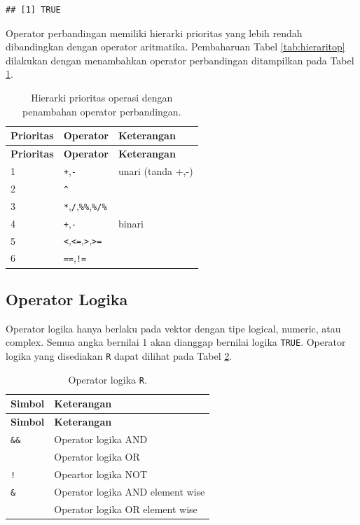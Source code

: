 \documentclass[12pt,]{krantz}
\begin{document}
\begin{verbatim}
## [1] TRUE
\end{verbatim}

Operator perbandingan memiliki hierarki prioritas yang lebih rendah dibandingkan dengan operator aritmatika. Pembaharuan Tabel \ref{tab:hieraritop} dilakukan dengan menambahkan operator perbandingan ditampilkan pada Tabel \ref{tab:hierperbandtop}.

\begin{longtable}[]{@{}lll@{}}
\caption{\label{tab:hierperbandtop} Hierarki prioritas operasi dengan penambahan operator perbandingan.}\tabularnewline
\toprule
\textbf{Prioritas} & \textbf{Operator} & \textbf{Keterangan}\tabularnewline
\midrule
\endfirsthead
\toprule
\textbf{Prioritas} & \textbf{Operator} & \textbf{Keterangan}\tabularnewline
\midrule
\endhead
1 & \texttt{+},\texttt{-} & unari (tanda +,-)\tabularnewline
2 & \texttt{\^{}} &\tabularnewline
3 & \texttt{*},\texttt{/},\texttt{\%\%},\texttt{\%/\%} &\tabularnewline
4 & \texttt{+},\texttt{-} & binari\tabularnewline
5 & \texttt{\textless{}},\texttt{\textless{}=},\texttt{\textgreater{}},\texttt{\textgreater{}=} &\tabularnewline
6 & \texttt{==},\texttt{!=} &\tabularnewline
\bottomrule
\end{longtable}

\hypertarget{operator-logika}{%
\subsection{Operator Logika}\label{operator-logika}}

Operator logika hanya berlaku pada vektor dengan tipe logical, numeric, atau complex. Semua angka bernilai 1 akan dianggap bernilai logika \texttt{TRUE}. Operator logika yang disediakan \texttt{R} dapat dilihat pada Tabel \ref{tab:oplogika}.

\begin{longtable}[]{@{}ll@{}}
\caption{\label{tab:oplogika} Operator logika \texttt{R}.}\tabularnewline
\toprule
\textbf{Simbol} & \textbf{Keterangan}\tabularnewline
\midrule
\endfirsthead
\toprule
\textbf{Simbol} & \textbf{Keterangan}\tabularnewline
\midrule
\endhead
\texttt{\&\&} & Operator logika AND\tabularnewline
\texttt{\textbar{}\textbar{}} & Operator logika OR\tabularnewline
\texttt{!} & Opeartor logika NOT\tabularnewline
\texttt{\&} & Operator logika AND element wise\tabularnewline
\texttt{\textbar{}} & Operator logika OR element wise\tabularnewline
\bottomrule
\end{longtable}
\end{document}

